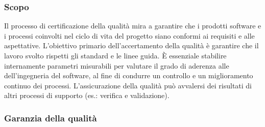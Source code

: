 \subsubsection{Scopo}
\par Il processo di certificazione della qualità mira a garantire che i prodotti software e i processi coinvolti nel ciclo di vita del progetto siano conformi ai requisiti e alle aspettative. L'obiettivo primario dell'accertamento della qualità è garantire che il lavoro svolto rispetti gli standard e le linee guida. È essenziale stabilire internamente parametri misurabili per valutare il grado di aderenza alle  dell'ingegneria del software, al fine di condurre un controllo e un miglioramento continuo dei processi. L'assicurazione della qualità può avvalersi dei risultati di altri processi di supporto (es.: verifica e validazione).

\subsubsection{Garanzia della qualità}

